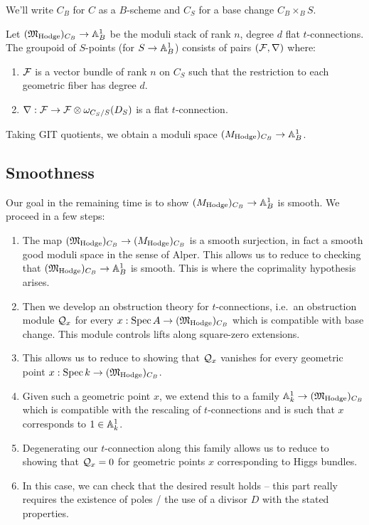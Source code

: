 \documentclass{amsart}
\begin{document}
We'll write $C_B$ for $C$ as a $B$-scheme and $C_S$ for a base change $C_B \times_B S$.

\begin{dfn}
	Let $(\MHodgefr)_{C_B} \to \AA^1_B$ be the moduli stack of rank $n$, degree $d$ flat $t$-connections.
	The groupoid of $S$-points (for $S \to \AA^1_B$) consists of pairs $(\Fc, \nabla)$ where:
	\begin{enumerate}
		\item $\Fc$ is a vector bundle of rank $n$ on $C_S$ such that the restriction to each geometric fiber has degree $d$.
		\item $\nabla: \Fc \to \Fc \otimes \omega_{C_S / S}(D_S)$ is a flat $t$-connection.
	\end{enumerate}
	Taking GIT quotients, we obtain a moduli space $(\MHodge)_{C_B} \to \AA^1_B$.
\end{dfn}

\subsection{Smoothness}

Our goal in the remaining time is to show $(\MHodge)_{C_B} \to \AA^1_B$ is smooth.
We proceed in a few steps:
\begin{enumerate}
	\item The map $(\MHodgefr)_{C_B} \to (\MHodge)_{C_B}$ is a smooth surjection, in fact a smooth good moduli space in the sense of Alper.
		This allows us to reduce to checking that $(\MHodgefr)_{C_B} \to \AA^1_B$ is smooth.
		This is where the coprimality hypothesis arises.
	\item Then we develop an obstruction theory for $t$-connections, i.e.\ an obstruction module $\Qc_x$ for every $x: \Spec A \to (\MHodgefr)_{C_B}$ which is compatible with base change.
		This module controls lifts along square-zero extensions.
	\item This allows us to reduce to showing that $\Qc_x$ vanishes for every geometric point $x: \Spec k \to (\MHodgefr)_{C_B}$.
	\item Given such a geometric point $x$, we extend this to a family $\AA^1_k \to (\MHodgefr)_{C_B}$ which is compatible with the rescaling of $t$-connections and is such that $x$ corresponds to $1 \in \AA^1_k$.
	\item Degenerating our $t$-connection along this family allows us to reduce to showing that $\Qc_x = 0$ for geometric points $x$ corresponding to Higgs bundles.
	\item In this case, we can check that the desired result holds -- this part really requires the existence of poles / the use of a divisor $D$ with the stated properties.
\end{enumerate}
\end{document}
